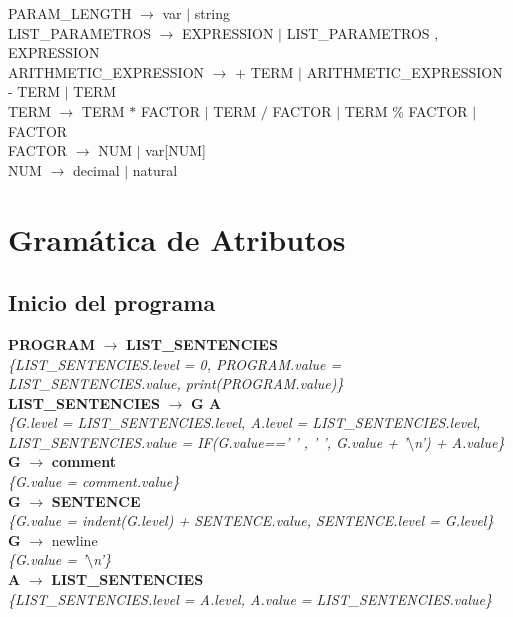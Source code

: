 \documentclass[10pt,a4paper]{article}
\begin{document}
PARAM\_LENGTH $\rightarrow$ var $|$ string \\

LIST\_PARAMETROS $\rightarrow$ EXPRESSION $|$ LIST\_PARAMETROS , EXPRESSION \\

ARITHMETIC\_EXPRESSION $\rightarrow$  + TERM $|$ ARITHMETIC\_EXPRESSION - TERM $|$ TERM \\

TERM $\rightarrow$ TERM $*$ FACTOR $|$ TERM $/$ FACTOR $|$ TERM \% FACTOR $|$ FACTOR \\

FACTOR $\rightarrow$ NUM $|$ var[NUM] \\

NUM $\rightarrow$ decimal $|$ natural


\section{Gramática de Atributos}

\subsection{Inicio del programa}
\textbf{PROGRAM} $\rightarrow$ \textbf{LIST\_SENTENCIES} \\
\textit{\{LIST\_SENTENCIES.level = 0, PROGRAM.value = LIST\_SENTENCIES.value, print(PROGRAM.value)\}}\\

\textbf{LIST\_SENTENCIES} $\rightarrow$ \textbf{G A}\\
\textit{\{G.level = LIST\_SENTENCIES.level, A.level = LIST\_SENTENCIES.level, LIST\_SENTENCIES.value = IF(G.value==' ' , ' ', G.value + '$\setminus$n') + A.value\}} \\

\textbf{G} $\rightarrow$ \textbf{comment} \\
\textit{\{G.value = comment.value\}} \\

\textbf{G} $\rightarrow$ \textbf{SENTENCE} \\
\textit{\{G.value = indent(G.level) + SENTENCE.value, SENTENCE.level = G.level\}} \\

\textbf{G} $\rightarrow$ newline \\
\textit{\{G.value = '$\setminus$n'\}} \\

\textbf{A} $\rightarrow$ \textbf{LIST\_SENTENCIES}\\
\textit{\{LIST\_SENTENCIES.level = A.level, A.value = LIST\_SENTENCIES.value\}} \\
\end{document}
